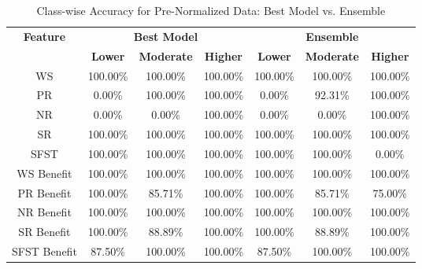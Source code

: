 \begin{table}[H]
\centering
\begin{tabular}{|c|c|c|c|c|c|c|}
\hline
\multirow{2}{*}{\textbf{Feature}} & \multicolumn{3}{c|}{\textbf{Best Model}} & \multicolumn{3}{c|}{\textbf{Ensemble}} \\
\cline{2-7}
 & \textbf{Lower} & \textbf{Moderate} & \textbf{Higher} & \textbf{Lower} & \textbf{Moderate} & \textbf{Higher} \\
\hline
WS & 100.00\% & 100.00\% & 100.00\% & 100.00\% & 100.00\% & 100.00\% \\
\hline
PR & 0.00\% & 100.00\% & 100.00\% & 0.00\% & 92.31\% & 100.00\% \\
\hline
NR & 0.00\% & 0.00\% & 100.00\% & 0.00\% & 0.00\% & 100.00\% \\
\hline
SR & 100.00\% & 100.00\% & 100.00\% & 100.00\% & 100.00\% & 100.00\% \\
\hline
SFST & 100.00\% & 100.00\% & 100.00\% & 100.00\% & 100.00\% & 0.00\% \\
\hline
WS Benefit & 100.00\% & 100.00\% & 100.00\% & 100.00\% & 100.00\% & 100.00\% \\
\hline
PR Benefit & 100.00\% & 85.71\% & 100.00\% & 100.00\% & 85.71\% & 75.00\% \\
\hline
NR Benefit & 100.00\% & 100.00\% & 100.00\% & 100.00\% & 100.00\% & 100.00\% \\
\hline
SR Benefit & 100.00\% & 88.89\% & 100.00\% & 100.00\% & 88.89\% & 100.00\% \\
\hline
SFST Benefit & 87.50\% & 100.00\% & 100.00\% & 87.50\% & 100.00\% & 100.00\% \\
\hline
\end{tabular}
\caption{Class-wise Accuracy for Pre-Normalized Data: Best Model vs. Ensemble}
\label{reg_all_tab:grouping_pre_norm_accuracy}
\end{table}


